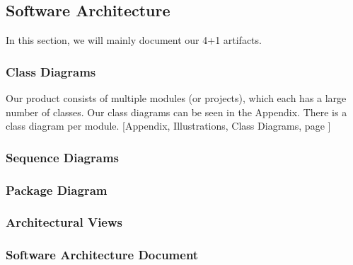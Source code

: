 \subsection{Software Architecture}
In this section, we will mainly document our 4+1 artifacts.
\subsubsection{Class Diagrams}
Our product consists of multiple modules (or projects), which each has a large number of classes. Our class diagrams can be seen in the Appendix. There is a class diagram per module.
[Appendix, Illustrations, Class Diagrams, page \pageref{classdiagrams}]
\subsubsection{Sequence Diagrams}
\subsubsection{Package Diagram}

\subsubsection{Architectural Views}
\subsubsection{Software Architecture Document}